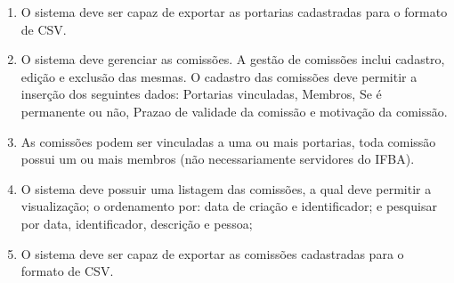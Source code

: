 \documentclass{scrreprt}
\begin{document}
\begin{enumerate}[label=\textbf{RF-\arabic*}]
\item 
O sistema deve ser capaz de exportar as portarias cadastradas para o formato de CSV.

\item
O sistema deve gerenciar as comissões. A gestão de comissões inclui cadastro, edição e exclusão das mesmas. O cadastro das comissões deve permitir a inserção dos seguintes dados: Portarias vinculadas, Membros, Se é permanente ou não, Prazao de validade da comissão e motivação da comissão.

\item
As comissões podem ser vinculadas a uma ou mais portarias, toda comissão possui um ou mais membros (não necessariamente servidores do IFBA).


\item
O sistema deve possuir uma listagem das comissões, a qual deve permitir a visualização; o ordenamento por:  data de criação e identificador; e pesquisar por data, identificador, descrição e pessoa;

\item
O sistema deve ser capaz de exportar as comissões cadastradas para o formato de CSV.

\end{enumerate}
\end{document}
